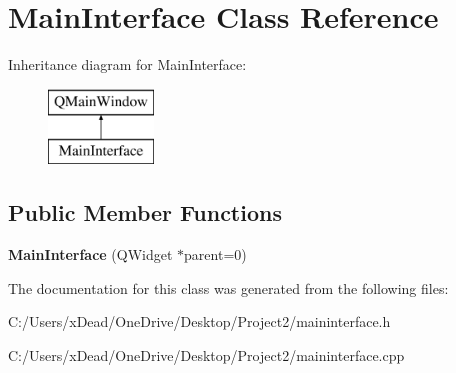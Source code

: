 \hypertarget{class_main_interface}{}\section{Main\+Interface Class Reference}
\label{class_main_interface}
Inheritance diagram for Main\+Interface\+:\begin{figure}[H]
\begin{center}
\leavevmode
\includegraphics[height=2.000000cm]{class_main_interface}
\end{center}
\end{figure}
\subsection*{Public Member Functions}
\begin{DoxyCompactItemize}
\item 
\mbox{\label{class_main_interface_a50ec59f9dc5489bbb18baae382dbc7ad}} 
{\bfseries Main\+Interface} (Q\+Widget $\ast$parent=0)
\end{DoxyCompactItemize}


The documentation for this class was generated from the following files\+:\begin{DoxyCompactItemize}
\item 
C\+:/\+Users/x\+Dead/\+One\+Drive/\+Desktop/\+Project2/maininterface.\+h\item 
C\+:/\+Users/x\+Dead/\+One\+Drive/\+Desktop/\+Project2/maininterface.\+cpp\end{DoxyCompactItemize}

